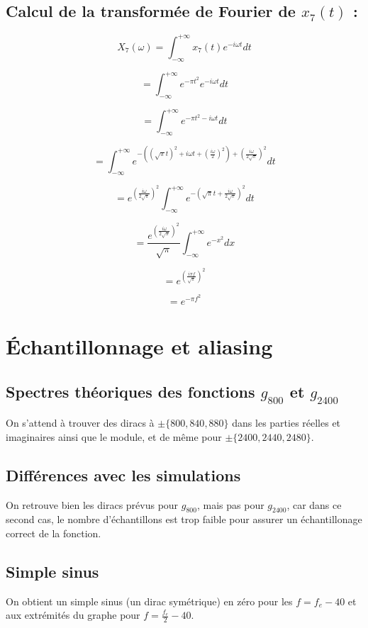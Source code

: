 \documentclass[12pt]{article}
\begin{document}
\subsection{Calcul de la transformée de Fourier de $x_7(t)$ :}
$$X_7(\omega) = \int_{-\infty}^{+\infty} x_7(t) e^{-i\omega t}dt$$

$$= \int_{-\infty}^{+\infty} e^{-\pi t^2} e^{-i\omega t}dt$$

$$= \int_{-\infty}^{+\infty} e^{-\pi t^2 -i\omega t}dt$$

$$= \int_{-\infty}^{+\infty} e^{-((\sqrt{\pi} t)^2 +i\omega t + (\frac{i\omega}{2})^2) + (\frac{i\omega}{2\sqrt{\pi}})^2}dt$$

$$= e^{(\frac{i\omega}{2\sqrt{\pi}})^2} \int_{-\infty}^{+\infty} e^{-(\sqrt{\pi}t + \frac{i\omega}{2\sqrt{\pi}})^2}dt$$

$$= \frac{e^{(\frac{i\omega}{2\sqrt{\pi}})^2}}{\sqrt{\pi}} \int_{-\infty}^{+\infty} e^{-x^2}dx$$

$$= e^{(\frac{i\pi f}{\sqrt{\pi}})^2}$$

$$= e^{-\pi f^2}$$

\section{Échantillonnage et aliasing}
\subsection{Spectres théoriques des fonctions $g_{800}$ et $g_{2400}$}
On s'attend à trouver des diracs à $\pm \{800, 840, 880\}$ dans les parties réelles et imaginaires ainsi que le module, et de même pour $\pm \{2400, 2440, 2480\}$.

\subsection{Différences avec les simulations}
On retrouve bien les diracs prévus pour $g_{800}$, mais pas pour $g_{2400}$, car dans ce second cas, le nombre d'échantillons est trop faible pour assurer un échantillonage correct de la fonction.

\subsection{Simple sinus}
On obtient un simple sinus (un dirac symétrique) en zéro pour les $f=f_e-40$ et aux extrémités du graphe pour $f=\frac{f_e}{2}-40$.
\end{document}
